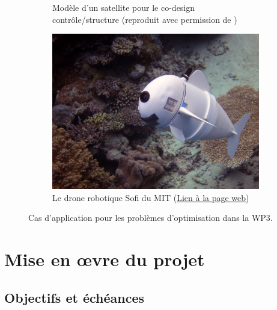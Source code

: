 \documentclass[12pt, french]{article}
\begin{document}
\begin{figure}[t]
\begin{subfigure}[t]{0.3\textwidth}
			\caption{Modèle d'un satellite pour le co-design contrôle/structure (reproduit avec permission de \cite{finozzi2022sub})}
			\label{fig:codesign_sat}
		\end{subfigure}\hfill
		\begin{subfigure}[t]{0.35\textwidth}
			\includegraphics[width=\columnwidth]{Sofi_MIT.jpeg}%
			\caption{Le drone robotique Sofi du MIT (\href{https://www.csail.mit.edu/research/sofi-soft-robotic-fish}{Lien à la page web})}
			\label{fig:sofi-mit}
		\end{subfigure}
		\caption[]{Cas d'application pour les problèmes d'optimisation dans la WP3.}%
		\label{fig:optmisation}%
	\end{figure}
	
	
	\section{Mise en \oe{}vre du projet}
	
	\subsection{Objectifs et échéances}
	
\end{document}
